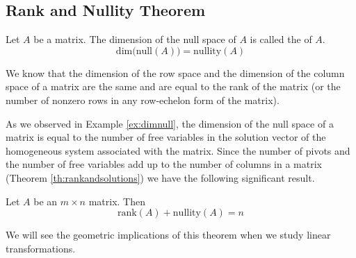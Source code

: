 \documentclass{ximera}
\begin{document}
\subsection*{Rank and Nullity Theorem}
\begin{definition}\label{def:matrixnullity}
Let $A$ be a matrix.  The dimension of the null space of $A$ is called the  of $A$.
$$\mbox{dim}\Big(\mbox{null}(A)\Big)=\mbox{nullity}(A)$$
\end{definition}

We know that the dimension of the row space and the dimension of the column space of a matrix are the same and are equal to the rank of the matrix (or the number of nonzero rows in any row-echelon form of the matrix).

As we observed in Example \ref{ex:dimnull}, the dimension of the null space of a matrix is equal to the number of free variables in the solution vector of the homogeneous system associated with the matrix.  Since the number of pivots and the number of free variables add up to the number of columns in a matrix (Theorem \ref{th:rankandsolutions}) we have the following significant result.

\begin{theorem}\label{th:matrixranknullity} Let $A$ be an $m\times n$ matrix.  Then 
$$\mbox{rank}(A)+\mbox{nullity}(A)=n$$
\end{theorem}
We will see the geometric implications of this theorem when we study linear transformations.
\end{document}
